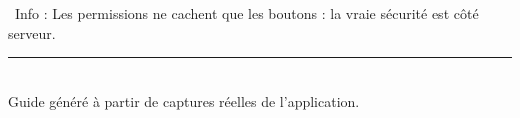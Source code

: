 \documentclass[12pt,a4paper]{article}
\newcommand{\info}[1]{\par\noindent\textcolor{lagoon}{\faInfoCircle\ Info : #1}\par}
\begin{document}
\info{Les permissions ne cachent que les boutons : la vraie sécurité est côté serveur.}

\vspace{1cm}
\begin{center}
  \textcolor{muted}{\rule{0.6\textwidth}{0.4pt}}\\[0.5em]
  \textcolor{muted}{Guide généré à partir de captures réelles de l'application.}
\end{center}
\end{document}
